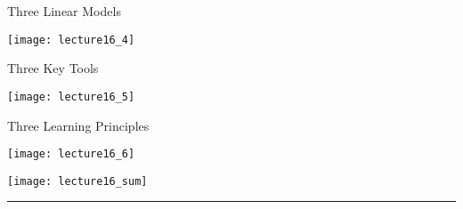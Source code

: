 \begin{center}
\Large{Three Linear Models} \par
\texttt{[image: lecture16\_4]}
\end{center}

\begin{center}
\Large{Three Key Tools} \par
\texttt{[image: lecture16\_5]}
\end{center}

\begin{center}
\Large{Three Learning Principles} \par
\texttt{[image: lecture16\_6]}
\end{center}
\begin{center}
\texttt{[image: lecture16\_sum]}
\end{center}
\noindent
{\color{RubineRed} \rule{\linewidth}{1mm} }
